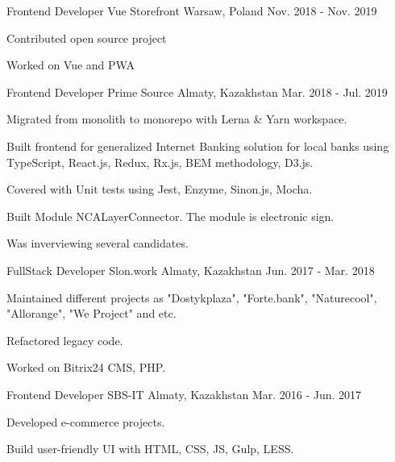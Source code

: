 \begin{cventries}
  \cventry
    {Frontend Developer} %
    {Vue Storefront} %
    {Warsaw, Poland} %
    {Nov. 2018 - Nov. 2019} %
    {
      \begin{cvitems} %
        \item {Contributed open source project}
        \item {Worked on Vue and PWA}
      \end{cvitems}
    }

  \cventry
    {Frontend Developer} %
    {Prime Source} %
    {Almaty, Kazakhstan} %
    {Mar. 2018 - Jul. 2019} %
    {
      \begin{cvitems} %
        \item {Migrated from monolith to monorepo with Lerna & Yarn workspace.}
        \item {Built frontend for generalized Internet Banking solution for local banks using TypeScript, React.js, Redux, Rx.js, BEM methodology, D3.js.}
        \item {Covered with Unit tests using Jest, Enzyme, Sinon.js, Mocha.}
        \item {Built Module NCALayerConnector. The module is electronic sign.}
        \item {Was inverviewing several candidates.}
      \end{cvitems}
    }

  \cventry
    {FullStack Developer} %
    {Slon.work} %
    {Almaty, Kazakhstan} %
    {Jun. 2017 - Mar. 2018} %
    {
      \begin{cvitems} %
        \item {Maintained different projects as "Dostykplaza", "Forte.bank", "Naturecool", "Allorange", "We Project" and etc.}
        \item {Refactored legacy code.}
        \item {Worked on Bitrix24 CMS, PHP.}
      \end{cvitems}
    }

  \cventry
    {Frontend Developer} %
    {SBS-IT} %
    {Almaty, Kazakhstan} %
    {Mar. 2016 - Jun. 2017} %
    {
      \begin{cvitems} %
        \item {Developed e-commerce projects.}
        \item {Build user-friendly UI with HTML, CSS, JS, Gulp, LESS.}
      \end{cvitems}
    }


\end{cventries}
